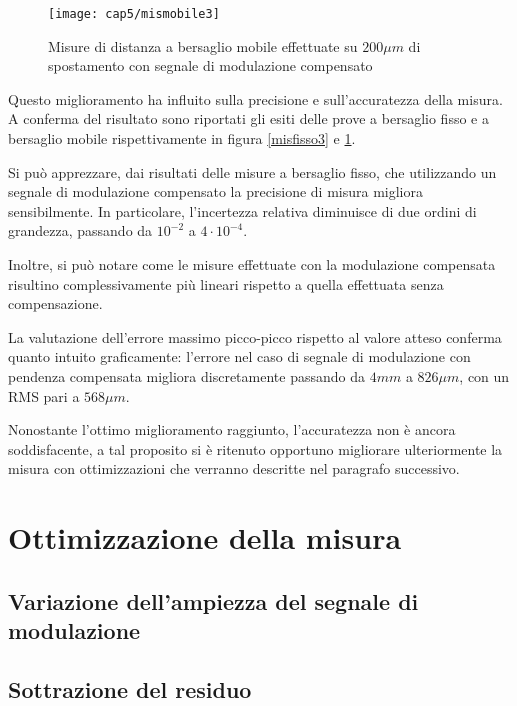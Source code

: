\begin{figure}  
  \begin{center}
    \texttt{[image: cap5/mismobile3]}
    \caption{Misure di distanza a bersaglio mobile effettuate su $200\mu m$ di spostamento con segnale di modulazione compensato}
    \label{mismobile3}
  \end{center}
\end{figure}

Questo miglioramento ha influito sulla precisione e sull'accuratezza della misura. A conferma del risultato sono riportati gli esiti delle prove a bersaglio fisso e a bersaglio mobile rispettivamente in figura \ref{misfisso3} e \ref{mismobile3}.

Si può apprezzare, dai risultati delle misure a bersaglio fisso, che utilizzando un segnale di modulazione compensato la precisione di misura migliora sensibilmente. In particolare, l'incertezza relativa diminuisce di due ordini di grandezza, passando da $10^{-2}$ a $4 \cdot 10^{-4}$.

Inoltre, si può notare come le misure effettuate con la modulazione compensata risultino complessivamente più lineari rispetto a quella effettuata senza compensazione.

La valutazione dell'errore massimo picco-picco rispetto al valore atteso conferma quanto intuito graficamente: l'errore nel caso di segnale di modulazione con pendenza compensata migliora discretamente passando da $4mm$ a $826 \mu m$, con un RMS pari a $568 \mu m$.

Nonostante l'ottimo miglioramento raggiunto, l'accuratezza non è ancora soddisfacente, a tal proposito si è ritenuto opportuno migliorare ulteriormente la misura con ottimizzazioni che verranno descritte nel paragrafo successivo.

\section{Ottimizzazione della misura}

\subsection{Variazione dell'ampiezza del segnale di modulazione}

\subsection{Sottrazione del residuo}

